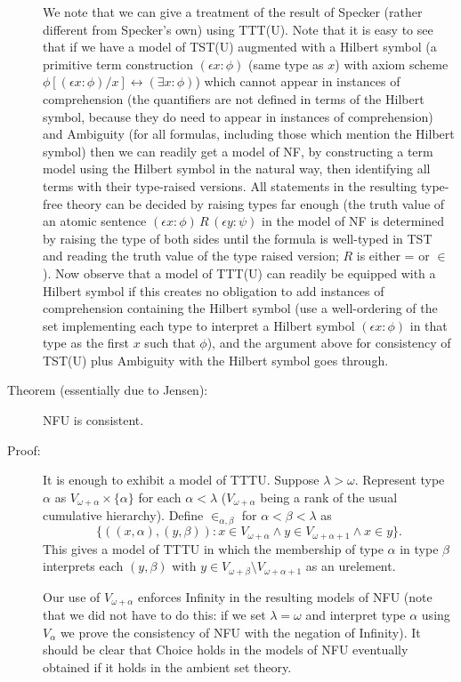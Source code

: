 \documentclass[12pt]{article}
\begin{document}
\begin{description}
We note that we can give a treatment of the result of Specker (rather different from Specker's own) using TTT(U).  Note that it is easy to see that if we have a model of TST(U) augmented with a Hilbert symbol (a primitive term construction $(\epsilon x:\phi)$ (same type as $x$) with axiom scheme $\phi[(\epsilon x:\phi)/x] \leftrightarrow (\exists x:\phi)$) which cannot appear in instances of comprehension (the quantifiers are not defined in terms of the Hilbert symbol, because they do need to appear in instances of comprehension) and Ambiguity (for all formulas, including those which mention the Hilbert symbol) then we can readily get a model of NF, by constructing a term model using the Hilbert symbol in the natural way, then identifying all terms with their type-raised versions.  All statements in the resulting type-free theory can be decided by raising types far enough (the truth value of an atomic sentence $(\epsilon x:\phi) \,R\, (\epsilon y:\psi)$ in the model of NF is determined by raising the type of both sides until the formula is well-typed in TST and reading the truth value of the type raised version;  $R$ is either = or $\in$).  Now observe that a model of TTT(U) can readily be equipped with a Hilbert symbol if this creates no obligation to add instances of comprehension
containing the Hilbert symbol (use a well-ordering of the set implementing each type to interpret a Hilbert symbol  $(\epsilon x:\phi)$ in that type as the first $x$ such that $\phi$), and the argument above for consistency of TST(U) plus Ambiguity with the Hilbert symbol goes through.

\item[Theorem (essentially due to Jensen):]  NFU is consistent.

\item[Proof:]  It is enough to exhibit a model of TTTU.  Suppose $\lambda>\omega$.  Represent type $\alpha$ as $V_{\omega+\alpha} \times \{\alpha\}$ for each $\alpha<\lambda$ ($V_{\omega+\alpha}$ being a rank of the usual cumulative hierarchy).  Define $\in_{\alpha,\beta}$ for
$\alpha<\beta<\lambda$ as $$\{((x,\alpha),(y,\beta)):x \in V_{\omega+\alpha} \wedge y \in V_{\omega+\alpha+1} \wedge x \in y\}.$$  This gives a model of TTTU in which the membership of
type $\alpha$ in type $\beta$ interprets each $(y,\beta)$ with $y \in V_{\omega+\beta} \setminus V_{\omega+\alpha+1}$ as an urelement.

Our use of $V_{\omega+\alpha}$ enforces Infinity in the resulting models of NFU (note that we did not have to do this:  if we set $\lambda=\omega$ and interpret type $\alpha$ using $V_\alpha$ we prove the consistency of NFU with the negation of Infinity).  It should be clear that Choice holds in the models of NFU eventually obtained if it holds in the ambient set theory.


\end{description}
\end{document}
